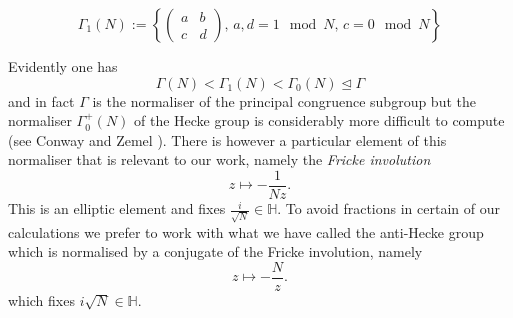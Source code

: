 \documentclass[12pt,a4paper]{amsart}
\def\HH{\mathbb{H}}
\def\ZZ{\mathbb{Z}}
\def\sl2{\mathrm{SL}(2, \ZZ)}
\begin{document}
$$ \Gamma_1(N) := \left \{ \begin{pmatrix} a & b \\ c & d
	\end{pmatrix},\, a,d = 1 \mod N,\,c = 0 \mod N \right
\}$$

Evidently  one has
$$\Gamma(N) < \Gamma_1(N) < \Gamma_0(N) \trianglelefteq \Gamma$$
and in fact $\Gamma$ is the normaliser of the principal congruence
subgroup but the normaliser $\Gamma_0^+(N)$ of the Hecke group  is
considerably more difficult to compute
(see Conway \cite{conway2} and Zemel \cite{zemel}).
There is however a particular element of this
normaliser that is relevant to our work, namely the 
\textit{Fricke involution}
$$z\mapsto -\frac{1}{Nz}.$$
This is an elliptic element and fixes $\frac{i}{\sqrt{N}}\in \mathbb{H}$.
To avoid fractions in certain of our calculations we prefer to work
with what we have called the anti-Hecke group which is normalised by a
conjugate of the Fricke involution, namely
$$z\mapsto -\frac{N}{z}.$$
 which fixes $i\sqrt{N}\in \mathbb{H}$.








\end{document}
